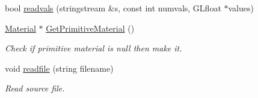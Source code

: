 \begin{DoxyCompactItemize}
bool \mbox{\hyperlink{class_scene_aa3778cb6ad047c2625e30d054260feb2}{readvals}} (stringstream \&s, const int numvals, G\+Lfloat $\ast$values)
\item 
\mbox{\label{class_scene_a08f9176af0dc288404db6b789a949c0a}} 
\mbox{\hyperlink{class_material}{Material}} $\ast$ \mbox{\hyperlink{class_scene_a08f9176af0dc288404db6b789a949c0a}{Get\+Primitive\+Material}} ()
\begin{DoxyCompactList}\small\item\em Check if primitive material is null then make it. \end{DoxyCompactList}\item 
\mbox{\label{class_scene_a1ecf3236a1ec2895c6f5b0a3ffe948ae}} 
void \mbox{\hyperlink{class_scene_a1ecf3236a1ec2895c6f5b0a3ffe948ae}{readfile}} (string filename)
\begin{DoxyCompactList}\small\item\em Read source file. \end{DoxyCompactList}\end{DoxyCompactItemize}

